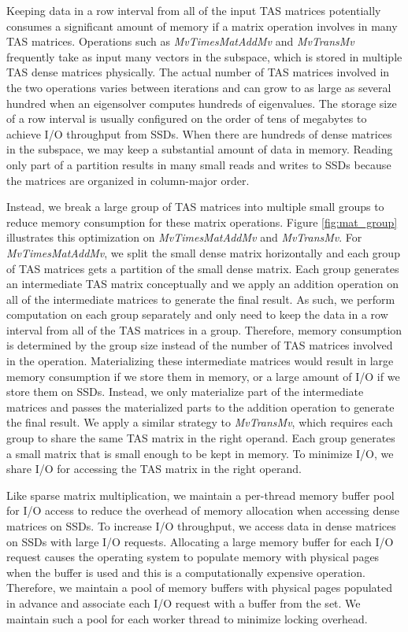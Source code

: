 Keeping data in a row interval from all of the input TAS matrices potentially
consumes a significant amount of memory if a matrix operation involves in many
TAS matrices.
Operations such as \textit{MvTimesMatAddMv} and \textit{MvTransMv} frequently
take as input many vectors in the subspace, which is stored in multiple TAS
dense matrices physically. The actual number of TAS matrices involved in
the two operations varies between iterations and can grow to as large as several
hundred when an eigensolver computes hundreds of eigenvalues. The storage size
of a row interval is usually configured on the order of tens of megabytes to
achieve I/O throughput from SSDs. When there are hundreds of dense matrices in
the subspace, we may keep a substantial amount of data in memory.
Reading only part of a partition results in many small reads and writes to
SSDs because the matrices are organized in column-major order.

Instead, we break a large group of TAS matrices into multiple small groups to
reduce memory consumption for these matrix operations. Figure \ref{fig:mat_group}
illustrates this optimization on \textit{MvTimesMatAddMv} and \textit{MvTransMv}.
For \textit{MvTimesMatAddMv}, we split the small dense matrix horizontally and
each group of TAS matrices gets a partition of the small dense matrix. Each group
generates an intermediate TAS matrix conceptually and we apply an addition
operation on all of the intermediate matrices to generate the final result.
As such, we perform computation on each group separately and only need to keep
the data in a row interval from all of the TAS matrices in a group. Therefore,
memory consumption is determined by the group size instead of the number of TAS
matrices involved in the operation. Materializing these intermediate matrices
would result in large memory consumption if we store them in memory, or a large
amount of I/O if we store them on SSDs. Instead, we only materialize part of
the intermediate matrices and passes the materialized parts to
the addition operation to generate the final result. We apply a similar strategy
to \textit{MvTransMv}, which requires each group to share the same TAS matrix in
the right operand. Each group generates a small matrix that is small enough to
be kept in memory. To minimize I/O, we share I/O for accessing the TAS matrix
in the right operand.

Like sparse matrix multiplication, we maintain a per-thread memory buffer pool
for I/O access to reduce the overhead of memory allocation when accessing dense
matrices on SSDs. To increase I/O throughput, we access data in dense matrices
on SSDs with large I/O requests. Allocating a large memory buffer for each I/O
request causes the operating system to populate memory with physical pages
when the buffer is used and this is a computationally expensive operation.
Therefore, we maintain a pool of memory buffers
with physical pages populated in advance and associate each I/O request with
a buffer from the set. We maintain such a pool for each worker thread to
minimize locking overhead.

